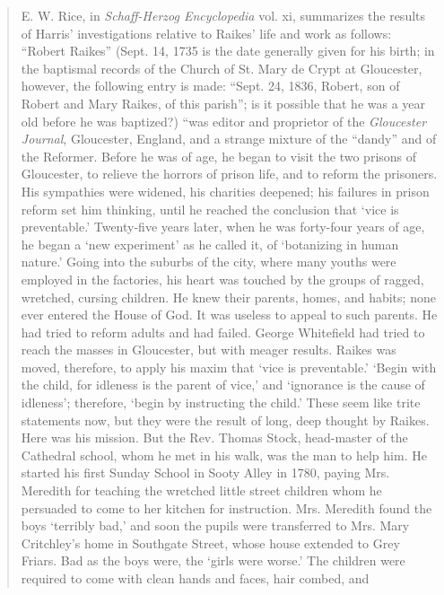 \begin{quote}
E. W. Rice, in \emph{Schaff-Herzog Encyclopedia} vol. xi, summarizes the results of Harris’ investigations relative to Raikes’ life and work as follows: “Robert Raikes” (Sept. 14, 1735 is the date generally given for his birth; in the baptismal records of the Church of St. Mary de Crypt at Gloucester, however, the following entry is made: “Sept. 24, 1836, Robert, son of Robert and Mary Raikes, of this parish”; is it possible that he was a year old before he was baptized?) “was editor and proprietor of the \emph{Gloucester Journal}, Gloucester, England, and a strange mixture of the “dandy” and of the Reformer. Before he was of age, he began to visit the two prisons of Gloucester, to relieve the horrors of prison life, and to reform the prisoners. His sympathies were widened, his charities deepened; his failures in prison reform set him thinking, until he reached the conclusion that ‘vice is preventable.’ Twenty-five years later, when he was forty-four years of age, he began a ‘new experiment’ as he called it, of ‘botanizing in human nature.’ Going into the suburbs of the city, where many youths were employed in the factories, his heart was touched by the groups of ragged, wretched, cursing children. He knew their parents, homes, and habits; none ever entered the House of God. It was useless to appeal to such parents. He had tried to reform adults and had failed. George Whitefield had tried to reach the masses in Gloucester, but with meager results. Raikes was moved, therefore, to apply his maxim that ‘vice is preventable.’ ‘Begin with the child, for idleness is the parent of vice,’ and ‘ignorance is the cause of idleness’; therefore, ‘begin by instructing the child.’ These seem like trite statements now, but they were the result of long, deep thought by Raikes. Here was his mission. But the Rev. Thomas Stock, head-master of the Cathedral school, whom he met in his walk, was the man to help him. He started his first Sunday School in Sooty Alley in 1780, paying Mrs. Meredith for teaching the wretched little street children whom he persuaded to come to her kitchen for instruction. Mrs. Meredith found the boys ‘terribly bad,’ and soon the pupils were transferred to Mrs. Mary Critchley’s home in Southgate Street, whose house extended to Grey Friars. Bad as the boys were, the ‘girls were worse.’ The children were required to come with clean hands and faces, hair combed, and

\end{quote}
